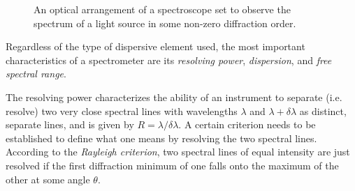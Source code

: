 \documentclass[12pt]{article}
\begin{document}
\begin{figure}[ht!]
    \caption{An optical arrangement of a spectroscope set to observe the spectrum of a light source in some non-zero diffraction order.}
    \label{Spectroscope}
\end{figure}

Regardless of the type of dispersive element used, the most important characteristics of a spectrometer are its \textit{resolving power}, \textit{dispersion}, and \textit{free spectral range}. 

The resolving power characterizes the ability of an instrument to separate (i.e. resolve) two very close spectral lines with wavelengths $\lambda$ and $\lambda + \delta \lambda$ as distinct, separate lines, and is given by $R = \lambda/\delta \lambda$. A certain criterion needs to be established to define what one means by resolving the two spectral lines. According to the \textit{Rayleigh criterion}, two spectral lines of equal intensity are just resolved if the first diffraction minimum of one falls onto the maximum of the other at some angle $\theta$.%
\end{document}
